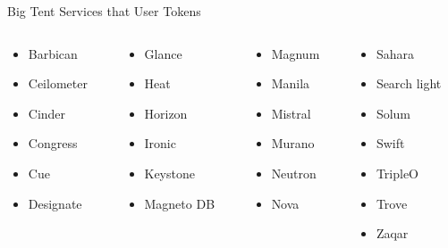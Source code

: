 \documentclass{beamer}
\begin{document}
\begin{frame}{Big Tent Services that User Tokens}
  \begin{columns}[t,onlytextwidth]
    \begin{column}{.25\textwidth}
      \begin{itemize}
      \item Barbican
      \item Ceilometer
      \item Cinder
      \item Congress
      \item Cue
      \item Designate
      \end{itemize}
    \end{column}

    \begin{column}{.25\textwidth}
      \begin{itemize}
      \item Glance
      \item Heat
      \item Horizon
      \item Ironic
      \item Keystone
      \item Magneto DB
      \end{itemize}
    \end{column}

    \begin{column}{.25\textwidth}
      \begin{itemize}
      \item Magnum
      \item Manila
      \item Mistral
      \item Murano
      \item Neutron
      \item Nova
      \end{itemize}
    \end{column}

    \begin{column}{.25\textwidth}
      \begin{itemize}
      \item Sahara
      \item Search light
      \item Solum
      \item Swift
      \item TripleO
      \item Trove
      \item Zaqar
      \end{itemize}
    \end{column}

  \end{columns}

\end{frame}
\end{document}
